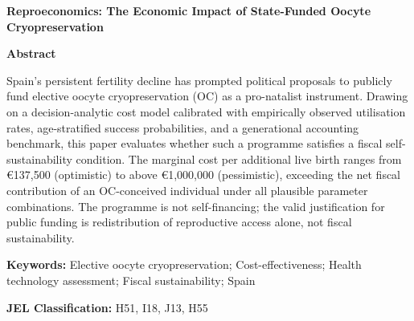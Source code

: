 \documentclass[12pt,a4paper]{article}
\begin{document}

\thispagestyle{fancy}

\begin{center}
{\large\bfseries Reproeconomics: The Economic Impact of State-Funded
Oocyte Cryopreservation}
\end{center}

\vspace{0.8em}


\noindent\textbf{Abstract}

\noindent Spain's persistent fertility decline has prompted political
proposals to publicly fund elective oocyte cryopreservation (OC) as a
pro-natalist instrument. Drawing on a decision-analytic cost model
calibrated with empirically observed utilisation rates, age-stratified
success probabilities, and a generational accounting benchmark, this
paper evaluates whether such a programme satisfies a fiscal
self-sustainability condition. The marginal cost per additional live
birth ranges from \euro{}137,500 (optimistic) to above
\euro{}1,000,000 (pessimistic), exceeding the net fiscal contribution
of an OC-conceived individual under all plausible parameter
combinations. The programme is not self-financing; the valid
justification for public funding is redistribution of reproductive
access alone, not fiscal sustainability.

\vspace{0.5em}

\noindent\textbf{Keywords:} Elective oocyte cryopreservation;
Cost-effectiveness; Health technology assessment; Fiscal sustainability;
Spain

\vspace{0.5em}

\noindent\textbf{JEL Classification:} H51, I18, J13, H55

\newpage

\end{document}
